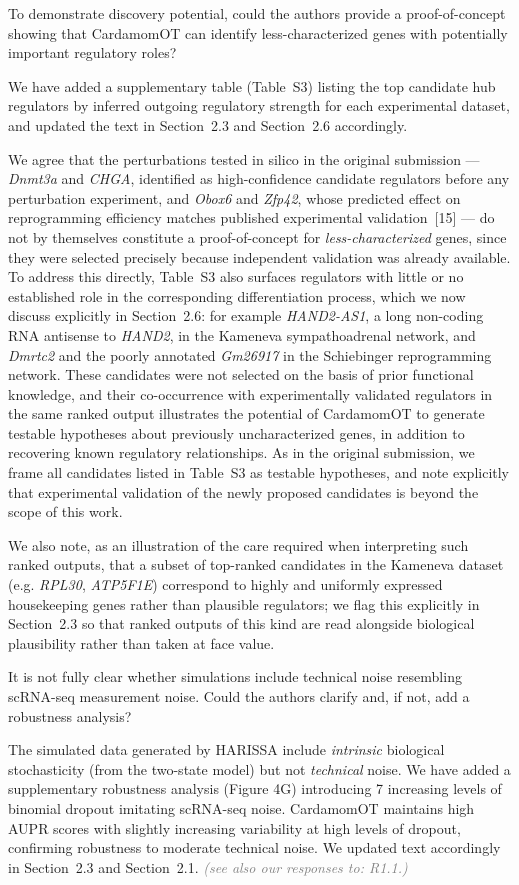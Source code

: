 \documentclass[11pt,a4paper]{article}
\newcounter{revtotal}   %
\newcounter{revlocal}   %
\newcommand{\currentreviewer}{}  %
\newcommand{\revcomment}[2]{%
  \stepcounter{revtotal}%
  \stepcounter{revlocal}%
  \edef\commentlabel{\currentreviewer.\arabic{revlocal}}%
  \begin{tcolorbox}[revstyle,
      title={\commentlabel\ $|$\ #1}]
    #2
  \end{tcolorbox}%
  \edef\lastcommentlabel{\commentlabel}%
}
\newcommand{\response}[1]{%
  \begin{tcolorbox}[respstyle,
      title={Response to \lastcommentlabel}]
    #1
  \end{tcolorbox}%
}
\newcommand{\seealso}[1]{\textit{\textcolor{gray}{(see also our responses to: #1)}}}
\begin{document}
\revcomment{Additional perturbation predictions for less-characterized genes}{%
To demonstrate discovery potential, could the authors provide a proof-of-concept showing
that CardamomOT can identify less-characterized genes with potentially important regulatory
roles?}
\response{%
We have added a supplementary table (Table~S3) listing the top candidate hub regulators by inferred outgoing regulatory strength for each experimental dataset, and updated the text in Section~2.3 and Section~2.6 accordingly.

We agree that the perturbations tested in silico in the original submission — \textit{Dnmt3a} and \textit{CHGA}, identified as high-confidence candidate regulators before any perturbation experiment, and \textit{Obox6} and \textit{Zfp42}, whose predicted effect on reprogramming efficiency matches published experimental validation~[15] — do not by themselves constitute a proof-of-concept for \emph{less-characterized} genes, since they were selected precisely because independent validation was already available. To address this directly, Table~S3 also surfaces regulators with little or no established role in the corresponding differentiation process, which we now discuss explicitly in Section~2.6: for example \textit{HAND2-AS1}, a long non-coding RNA antisense to \textit{HAND2}, in the Kameneva sympathoadrenal network, and \textit{Dmrtc2} and the poorly annotated \textit{Gm26917} in the Schiebinger reprogramming network. These candidates were not selected on the basis of prior functional knowledge, and their co-occurrence with experimentally validated regulators in the same ranked output illustrates the potential of CardamomOT to generate testable hypotheses about previously uncharacterized genes, in addition to recovering known regulatory relationships. As in the original submission, we frame all candidates listed in Table~S3 as testable hypotheses, and note explicitly that experimental validation of the newly proposed candidates is beyond the scope of this work.

We also note, as an illustration of the care required when interpreting such ranked outputs, that a subset of top-ranked candidates in the Kameneva dataset (e.g. \textit{RPL30}, \textit{ATP5F1E}) correspond to highly and uniformly expressed housekeeping genes rather than plausible regulators; we flag this explicitly in Section~2.3 so that ranked outputs of this kind are read alongside biological plausibility rather than taken at face value.}

\revcomment{Clarification of simulated-data noise model}{%
It is not fully clear whether simulations include technical noise resembling scRNA-seq
measurement noise. Could the authors clarify and, if not, add a robustness analysis?}
\response{%
The simulated data generated by HARISSA include \textit{intrinsic} biological stochasticity
(from the two-state model) but not \textit{technical} noise. We have added a supplementary robustness analysis (Figure 4G) introducing 7 increasing levels of binomial dropout imitating scRNA-seq noise. CardamomOT maintains high AUPR scores with slightly increasing variability at high levels of dropout, confirming robustness to moderate technical noise. 
We updated text accordingly in Section~2.3 and Section~2.1.
\seealso{R1.1.}}
\end{document}
